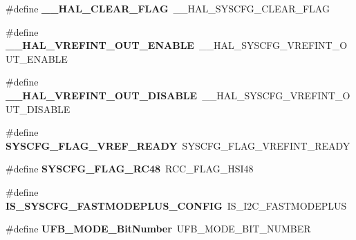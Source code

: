 \begin{DoxyCompactItemize}
\item 
\#define {\bfseries \+\_\+\+\_\+\+H\+A\+L\+\_\+\+C\+L\+E\+A\+R\+\_\+\+F\+L\+AG}~\+\_\+\+\_\+\+H\+A\+L\+\_\+\+S\+Y\+S\+C\+F\+G\+\_\+\+C\+L\+E\+A\+R\+\_\+\+F\+L\+AG\hypertarget{group___h_a_l___aliased___macros_ga5c6118ac714daf269dfcf8b0dc5740cf}{}\label{group___h_a_l___aliased___macros_ga5c6118ac714daf269dfcf8b0dc5740cf}

\item 
\#define {\bfseries \+\_\+\+\_\+\+H\+A\+L\+\_\+\+V\+R\+E\+F\+I\+N\+T\+\_\+\+O\+U\+T\+\_\+\+E\+N\+A\+B\+LE}~\+\_\+\+\_\+\+H\+A\+L\+\_\+\+S\+Y\+S\+C\+F\+G\+\_\+\+V\+R\+E\+F\+I\+N\+T\+\_\+\+O\+U\+T\+\_\+\+E\+N\+A\+B\+LE\hypertarget{group___h_a_l___aliased___macros_gac1dfd2bab2879b5106f1dc496e3c356c}{}\label{group___h_a_l___aliased___macros_gac1dfd2bab2879b5106f1dc496e3c356c}

\item 
\#define {\bfseries \+\_\+\+\_\+\+H\+A\+L\+\_\+\+V\+R\+E\+F\+I\+N\+T\+\_\+\+O\+U\+T\+\_\+\+D\+I\+S\+A\+B\+LE}~\+\_\+\+\_\+\+H\+A\+L\+\_\+\+S\+Y\+S\+C\+F\+G\+\_\+\+V\+R\+E\+F\+I\+N\+T\+\_\+\+O\+U\+T\+\_\+\+D\+I\+S\+A\+B\+LE\hypertarget{group___h_a_l___aliased___macros_ga8ef2904e9bea234864ed664771aeed49}{}\label{group___h_a_l___aliased___macros_ga8ef2904e9bea234864ed664771aeed49}

\item 
\#define {\bfseries S\+Y\+S\+C\+F\+G\+\_\+\+F\+L\+A\+G\+\_\+\+V\+R\+E\+F\+\_\+\+R\+E\+A\+DY}~S\+Y\+S\+C\+F\+G\+\_\+\+F\+L\+A\+G\+\_\+\+V\+R\+E\+F\+I\+N\+T\+\_\+\+R\+E\+A\+DY\hypertarget{group___h_a_l___aliased___macros_ga2978f132138676255e533e6f18fbe5df}{}\label{group___h_a_l___aliased___macros_ga2978f132138676255e533e6f18fbe5df}

\item 
\#define {\bfseries S\+Y\+S\+C\+F\+G\+\_\+\+F\+L\+A\+G\+\_\+\+R\+C48}~R\+C\+C\+\_\+\+F\+L\+A\+G\+\_\+\+H\+S\+I48\hypertarget{group___h_a_l___aliased___macros_gaaf8b670b9f5fdd39553af1637189456c}{}\label{group___h_a_l___aliased___macros_gaaf8b670b9f5fdd39553af1637189456c}

\item 
\#define {\bfseries I\+S\+\_\+\+S\+Y\+S\+C\+F\+G\+\_\+\+F\+A\+S\+T\+M\+O\+D\+E\+P\+L\+U\+S\+\_\+\+C\+O\+N\+F\+IG}~I\+S\+\_\+\+I2\+C\+\_\+\+F\+A\+S\+T\+M\+O\+D\+E\+P\+L\+US\hypertarget{group___h_a_l___aliased___macros_ga57549e7341a90913bac75a34768b9562}{}\label{group___h_a_l___aliased___macros_ga57549e7341a90913bac75a34768b9562}

\item 
\#define {\bfseries U\+F\+B\+\_\+\+M\+O\+D\+E\+\_\+\+Bit\+Number}~U\+F\+B\+\_\+\+M\+O\+D\+E\+\_\+\+B\+I\+T\+\_\+\+N\+U\+M\+B\+ER\hypertarget{group___h_a_l___aliased___macros_gaa531b9c8535235ee73455c2b88663c03}{}\label{group___h_a_l___aliased___macros_gaa531b9c8535235ee73455c2b88663c03}


\end{DoxyCompactItemize}

